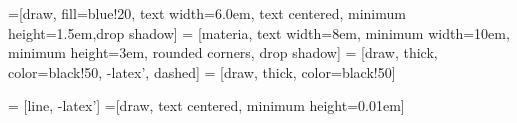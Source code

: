  \usepackage[T1]{fontenc}
 \usepackage[utf8]{inputenc}
 \usepackage{lmodern}
 \usepackage[french]{babel} \usepackage{lmodern}


\usepackage[a4paper, margin=2.5cm]{geometry}	%
\usepackage{arev}									%
\renewcommand{\baselinestretch}{1.15} 				%
\setlength\parindent{4pt}							%
\usepackage[skip=5pt,font=footnotesize]{caption}
\usepackage{float}
\usepackage{xcolor}									%
\usepackage{tabu}

\usepackage{hyperref}								%
\usepackage{amsmath}								%
\usepackage{listings}								%
\usepackage[refpage]{nomencl}						%
\usepackage{xpatch}
\makenomenclature

\usepackage{graphicx}
\usepackage{epstopdf}
\usepackage{subcaption}
\usepackage{tikz}
\usepackage{includes/tikz-uml}
\usetikzlibrary{calc,trees,positioning,arrows,chains,shapes.geometric,%
    decorations.pathreplacing,decorations.pathmorphing,shapes,%
    matrix,shapes.symbols,fit}


=[draw, fill=blue!20, text width=6.0em, text centered,
  minimum height=1.5em,drop shadow]
 = [materia, text width=8em, minimum width=10em,
  minimum height=3em, rounded corners, drop shadow]
 = [draw, thick, color=black!50, -latex', dashed]
 = [draw, thick, color=black!50]

 = [line, -latex']
=[draw, text centered, minimum height=0.01em]

\newcommand{\blockdist}{1.3}
\newcommand{\edgedist}{1.5}

\newcommand{\module}[2]{node (p#1) [module]
  {#2}}
